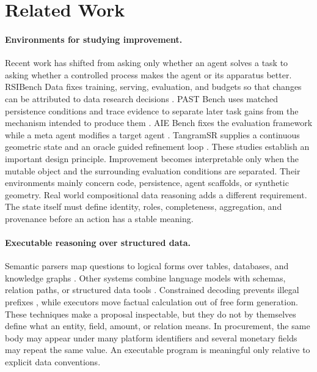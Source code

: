 \documentclass{article}
\begin{document}
\section{Related Work}
\label{sec:related}

\paragraph{Environments for studying improvement.}
Recent work has shifted from asking only whether an agent solves a task to asking whether a
controlled process makes the agent or its apparatus better.  RSIBench Data fixes training,
serving, evaluation, and budgets so that changes can be attributed to data research decisions
\citep{meng2026rsibench}.  PAST Bench uses matched persistence conditions and trace evidence to
separate later task gains from the mechanism intended to produce them \citep{xue2026past}.
AIE Bench fixes the evaluation framework while a meta agent modifies a target agent
\citep{mishra2026aie}.  TangramSR supplies a continuous geometric state and an oracle guided
refinement loop \citep{tan2026tangramsr}.  These studies establish an important design principle.
Improvement becomes interpretable only when the mutable object and the surrounding evaluation
conditions are separated.  Their environments mainly concern code, persistence, agent scaffolds,
or synthetic geometry.  Real world compositional data reasoning adds a different requirement.
The state itself must define identity, roles, completeness, aggregation, and provenance before an
action has a stable meaning.

\paragraph{Executable reasoning over structured data.}
Semantic parsers map questions to logical forms over tables, databases, and knowledge graphs
\citep{pasupat2015compositional,wang2020ratsql,cheng2023binder}.  Other systems combine language
models with schemas, relation paths, or structured data tools
\citep{jiang2023structgpt,luo2024chatkbqa,luo2024rog}.  Constrained decoding prevents illegal
prefixes \citep{scholak2021picard,dong2024xgrammar}, while executors move factual calculation out
of free form generation.  These techniques make a proposal inspectable, but they do not by
themselves define what an entity, field, amount, or relation means.  In procurement, the same body
may appear under many platform identifiers and several monetary fields may repeat the same value.
An executable program is meaningful only relative to explicit data conventions.
\end{document}

